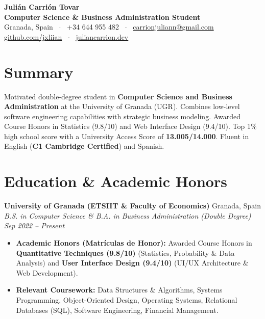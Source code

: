 \documentclass[10pt,a4paper]{article}
\begin{document}
\begin{center}
    {\huge \bfseries \color{primarycolor} Julián Carrión Tovar} \\[3pt]
    {\color{accentcolor}\bfseries Computer Science \& Business Administration Student} \\[4pt]
    {\small \color{textcolor}
    Granada, Spain \ $\cdot$ \ +34 644 955 482 \ $\cdot$ \ \href{mailto:carrionjuliann@gmail.com}{carrionjuliann@gmail.com} \\
    \href{https://github.com/jxliian}{github.com/jxliian} \ $\cdot$ \ \href{https://juliancarrion.dev}{juliancarrion.dev}
    }
\end{center}

\vspace{-4pt}

\section{Summary}
Motivated double-degree student in \textbf{Computer Science and Business Administration} at the University of Granada (UGR). Combines low-level software engineering capabilities with strategic business modeling. Awarded Course Honors in Statistics (9.8/10) and Web Interface Design (9.4/10). Top 1\% high school score with a University Access Score of \textbf{13.005/14.000}. Fluent in English (\textbf{C1 Cambridge Certified}) and Spanish.

\section{Education \& Academic Honors}
\textbf{University of Granada (ETSIIT \& Faculty of Economics)} \hfill Granada, Spain \\
\textit{B.S. in Computer Science \& B.A. in Business Administration (Double Degree)} \hfill \textit{Sep 2022 -- Present}
\begin{itemize}
    \item \textbf{Academic Honors (Matrículas de Honor):} Awarded Course Honors in \textbf{Quantitative Techniques (9.8/10)} (Statistics, Probability \& Data Analysis) and \textbf{User Interface Design (9.4/10)} (UI/UX Architecture \& Web Development).
    \item \textbf{Relevant Coursework:} Data Structures \& Algorithms, Systems Programming, Object-Oriented Design, Operating Systems, Relational Databases (SQL), Software Engineering, Financial Management.
\end{itemize}
\end{document}
